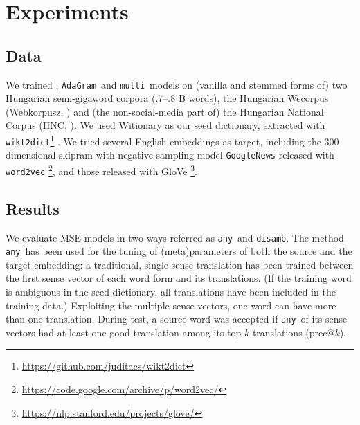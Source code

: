 \documentclass[11pt]{article}
\newcommand{\neelakantan}{\cite{Neelakantan:2014}}
\newcommand{\adagram}{\texttt{AdaGram}}
\newcommand{\mutli}{\texttt{mutli}}
\begin{document}
\section{Experiments}

\subsection{Data}

We trained \neelakantan, \adagram~and \mutli~models on (vanilla and stemmed
forms of) two Hungarian semi-gigaword corpora (.7--.8 B words), the Hungarian
Wecorpus (Webkorpusz, \cite{Halacsy:2004}) and (the non-social-media part of) the
Hungarian National Corpus (HNC, \cite{Oravecz:2014}).  We used Witionary as our
seed dictionary, extracted with
\texttt{wikt2dict}\footnote{\url{https://github.com/juditacs/wikt2dict}}
\citep{Acs:2013}. We tried several English embeddings as target, including the
300 dimensional skipram with negative sampling model
\texttt{GoogleNews} released with \texttt{word2vec}
\citep{Mikolov:2013f}\footnote{\url{https://code.google.com/archive/p/word2vec/}},
and those released with GloVe
\citep{Pennington:2014}\footnote{\url{https://nlp.stanford.edu/projects/glove/}}.

\subsection{Results}

\newcommand{\any}{\texttt{any}}
\newcommand{\disamb}{\texttt{disamb}}

We evaluate MSE models in two ways referred as \any~and \disamb.
The method \any~has been used for the tuning of (meta)parameters of
both the source and the target embedding: a traditional, single-sense
translation has been trained between the first sense vector of each word form and
its translations. (If the training word is ambiguous in the seed dictionary,
all translations have been included in the training data.)  Exploiting the
multiple sense vectors, one word can have more than one translation.  During
test, a source word was accepted if \any~of its sense vectors had at least one
good translation among its top $k$ translations (prec@$k$).
\end{document}

